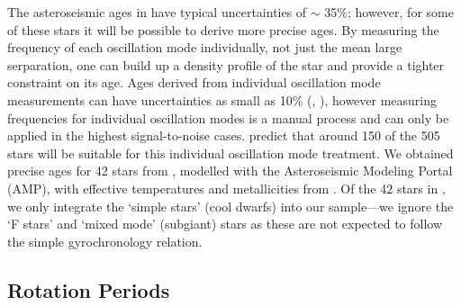 \documentclass[10pt,preprint]{aastex}
\begin{document}
The asteroseismic ages in \citet{Chaplin2013} have typical uncertainties of $\sim$ 35\%; however, for some of these stars it will be possible to derive more precise ages.
By measuring the frequency of each oscillation mode individually, not just the mean large serparation, one can build up a density profile of the star and provide a tighter constraint on its age.
Ages derived from individual oscillation mode measurements can have uncertainties as small as 10\% (\citet{Brown1994}, \citet{SilvaAguirre2013}), however measuring frequencies for individual oscillation modes is a manual process and can only be applied in the highest signal-to-noise cases.
\citet{Chaplin2013} predict that around 150 of the 505 stars will be suitable for this individual oscillation mode treatment.
We obtained precise ages for 42 stars from \citet{Metcalfe2014}, modelled with the Asteroseismic Modeling Portal (AMP), with effective temperatures and metallicities from \citet{Bruntt2012}.
Of the 42 stars in \citet{Metcalfe2014}, we only integrate the `simple stars' (cool dwarfs) into our sample---we ignore the `F stars' and `mixed mode' (subgiant) stars as these are not expected to follow the simple gyrochronology relation.

\subsection{Rotation Periods}
\label{sec:rotation_periods}
\end{document}
